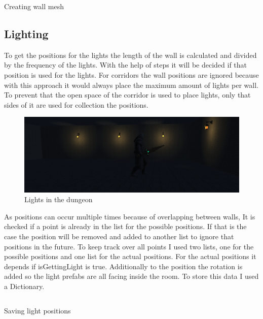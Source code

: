 \documentclass[a4paper,11pt,oneside]{scrreprt}
\begin{document}
\begin{listing}[ht]
    \inputminted[fontsize=\footnotesize,linenos]{csharp}{code/CreateWalls3.cs}
    \caption[Creating wall mesh]{Creating wall mesh}
    \label{code:creating-wall-mesh}
\end{listing}

\newpage
\subsection{Lighting}
\label{subsection:lighting}
To get the positions for the lights the length of the wall is calculated and divided by the frequency of the lights. With the help of steps it will be decided if that position is used for the lights. For corridors the wall positions are ignored because with this approach it would always place the maximum amount of lights per wall. To prevent that the open space of the corridor is used to place lights, only that sides of it are used for collection the positions.
\begin{figure}[htb]
	\centering
	\includegraphics[scale=0.5]{images/lights.png}   
	\caption{Lights in the dungeon}
	\label{fig:lights}
\end{figure}
As positions can occur multiple times because of overlapping between walls, It is checked if a point is already in the list for the possible positions. If that is the case the position will be removed and added to another list to ignore that positions in the future. To keep track over all points I used two lists, one for the possible positions and one list for the actual positions. For the actual positions it depends if isGettingLight is true. Additionally to the position the rotation is added so the light prefabs are all facing inside the room. To store this data I used a Dictionary. 
\begin{listing}[ht]
    \inputminted[fontsize=\footnotesize,linenos]{csharp}{code/Lights2.cs}
    \caption[Saving light positions]{Saving light positions}
    \label{code:saving-light-positions}
\end{listing}
\end{document}
